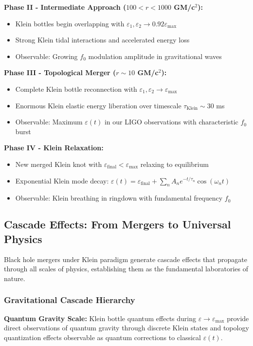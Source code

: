 \documentclass[12pt]{iopart}
\newcommand{\epsmax}{\varepsilon_{\text{max}}}
\newcommand{\fzero}{f_0}
\begin{document}
\textbf{Phase II - Intermediate Approach ($100 < r < 1000$ GM/c$^2$):}
\begin{itemize}
\item Klein bottles begin overlapping with $\varepsilon_1, \varepsilon_2 \to 0.92 \epsmax$
\item Strong Klein tidal interactions and accelerated energy loss
\item Observable: Growing $\fzero$ modulation amplitude in gravitational waves
\end{itemize}

\textbf{Phase III - Topological Merger ($r \sim 10$ GM/c$^2$):}
\begin{itemize}
\item Complete Klein bottle reconnection with $\varepsilon_1, \varepsilon_2 \to \epsmax$
\item Enormous Klein elastic energy liberation over timescale $\tau_{\text{Klein}} \sim 30$ ms
\item Observable: Maximum $\varepsilon(t)$ in our LIGO observations with characteristic $\fzero$ burst
\end{itemize}

\textbf{Phase IV - Klein Relaxation:}
\begin{itemize}
\item New merged Klein knot with $\varepsilon_{\text{final}} < \epsmax$ relaxing to equilibrium  
\item Exponential Klein mode decay: $\varepsilon(t) = \varepsilon_{\text{final}} + \sum_n A_n e^{-t/\tau_n} \cos(\omega_n t)$
\item Observable: Klein breathing in ringdown with fundamental frequency $\fzero$
\end{itemize}

\subsection{Cascade Effects: From Mergers to Universal Physics}

Black hole mergers under Klein paradigm generate cascade effects that propagate through all scales of physics, establishing them as the fundamental laboratories of nature.

\subsubsection{Gravitational Cascade Hierarchy}

\textbf{Quantum Gravity Scale:} Klein bottle quantum effects during $\varepsilon \to \epsmax$ provide direct observations of quantum gravity through discrete Klein states and topology quantization effects observable as quantum corrections to classical $\varepsilon(t)$.
\end{document}
